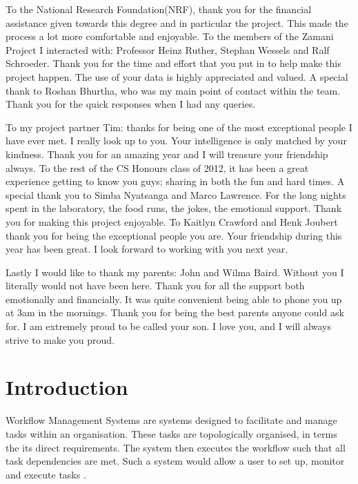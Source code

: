\documentclass[12pt,a4paper]{report}
\begin{document}
To the National Research Foundation(NRF), thank you for the financial assistance
given towards this degree and in particular the project. This made the process
a lot more comfortable and enjoyable. To the members of the Zamani Project I
interacted with: Professor Heinz Ruther, Stephan Wessels and Ralf Schroeder. 
Thank you for the time and effort that you put in to help make this project
happen. The use of your data is highly appreciated and valued. A special thank 
to Roshan Bhurtha, who was my main point of contact within the team. Thank you
for the quick responses when I had any queries.

To my project partner Tim: thanks for being one of the most exceptional people I
have ever met. I really look up to you. Your intelligence is only matched by
your kindness. Thank you for an amazing year and I will treasure your friendship
always. To the rest of the CS Honours class of 2012, it has been a great
experience getting to know you guys; sharing in both the fun and hard times. 
A special thank you to Simba Nyatsanga and Marco Lawrence. For
the long nights spent in the laboratory, the food runs, the jokes, the emotional
support. Thank you for making this project enjoyable. To Kaitlyn Crawford and 
Henk Joubert thank you for being the exceptional people you are. Your friendship
during this year has been great. I look forward to working with you next year.

Lastly I would like to thank my parents: John and Wilma Baird. Without you I
literally would not have been here. Thank you for all the support both
emotionally and financially. It was quite convenient being able to phone you up
at 3am in the mornings. Thank you for being the best parents anyone could ask
for. I am extremely proud to be called your son. I love you, and I will always
strive to make you proud.



\tableofcontents
\newpage
\listoffigures
\newpage
{}
\chapter{Introduction}
    Workflow Management Systems are systems designed to facilitate and manage
    tasks within an organisation. These tasks are topologically organised, in
    terms the its direct requirements. The system then executes the workflow
    such that all task dependencies are met. Such a system would allow a user to
    set up, monitor and execute tasks \cite{slot2005workflow}.
\end{document}
